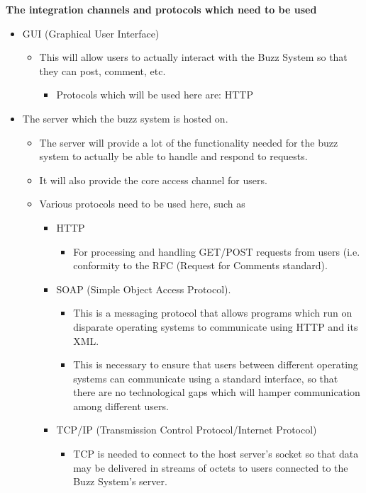 \documentclass[11pt]{article}
\begin{document}
	\newpage
	
	\textbf{The integration channels and protocols which need to be used}
	\\
	\begin{itemize}
	\item GUI (Graphical User Interface)
		\begin{itemize}
			\item This will allow users to actually interact with the Buzz System so that they can post, comment, etc. 
			\begin{itemize}
				\item Protocols which will be used here are: HTTP
			\end{itemize}
		\end{itemize}
	\item The server which the buzz system is hosted on.
		\begin{itemize}
			\item The server will provide a lot of the functionality needed for the buzz system to actually be able to handle and respond to requests.
			\item It will also provide the core access channel for users. 
			\item Various protocols need to be used here, such as
				\begin{itemize}
					\item HTTP
						\begin{itemize}
							\item For processing and handling GET/POST requests from users (i.e. conformity to the RFC (Request for Comments standard).
						\end{itemize}
					\item SOAP (Simple Object Access Protocol). 
						\begin{itemize}
							\item This is a messaging protocol that allows programs which run on disparate operating systems to communicate using HTTP and its XML. 
							\item This is necessary to ensure that users between different operating systems can communicate using a standard interface, so that there are no technological gaps which will hamper communication among different users.
						\end{itemize}
					\item TCP/IP (Transmission Control Protocol/Internet Protocol)
						\begin{itemize}
							\item TCP is needed to connect to the host server's socket so that data may be delivered in streams of octets to users connected to the Buzz System's server.

\end{itemize}
\end{itemize}
\end{itemize}
\end{itemize}
\end{document}
